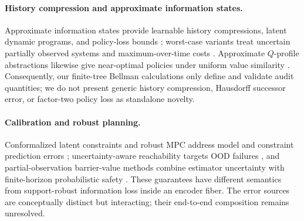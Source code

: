 \paragraph{History compression and approximate information states.}
Approximate information states provide learnable history compressions, latent dynamic programs,
and policy-loss bounds \citep{subramanian2022ais}; worst-case variants treat uncertain partially
observed systems and maximum-over-time costs \citep{dave2024ais}.  Approximate $Q$-profile
abstractions likewise give near-optimal policies under uniform value similarity
\citep{abel2016approximate}.  Consequently, our finite-tree Bellman calculations only define and
validate audit quantities; we do not present generic history compression, Hausdorff successor error,
or factor-two policy loss as standalone novelty.

\paragraph{Calibration and robust planning.}
Conformalized latent constraints and robust MPC address model and constraint prediction errors
\citep{nath2026pixels}; uncertainty-aware reachability targets OOD failures
\citep{seo2025uncertainty}, and partial-observation barrier-value methods combine estimator
uncertainty with finite-horizon probabilistic safety \citep{jahanshahi2026cbvf}.  These guarantees
have different semantics from support-robust information loss inside an encoder fiber.  The error
sources are conceptually distinct but interacting; their end-to-end composition remains unresolved.
